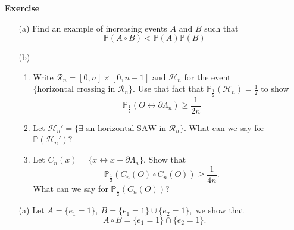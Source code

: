 \documentclass[12pt,a4paper]{report}
\theoremstyle{definition}
\newcommand{\SOL}{\fbox{ \tt s\parbox[b][2pt][c]{6pt}{o}\hspace*{-7pt} L:}}
\begin{document}
\begin{enumerate}
\begin{proof}
\begin{enumerate}
    \end{enumerate}
    Next, we show that $s_k$ is 1-1 and make conclude. By the behavior of $s_k$, it suffices to show that $s_k(\hat{\omega})\notin\hat{A}^{k+1}\circ \hat{B} $ if $\hat{\omega}\notin \hat{A}^k\circ \hat{B}.$ Suppose that $\hat{\omega}^k\in A,$ because of $\hat{\omega}^{k+1}\in A$ and 
    \newpage
    $A$ is a increasing event, we find that $I\backslash\{e_k\}$ is a witness of $\hat{\omega}\in \hat{A}^{k+1}$(also $\hat{\omega}\in \hat{A}^k$), $J$ is a witness of $\hat{
    \omega}\in \hat{B},\Rightarrow \hat{\omega}\in \hat{A}^k\circ \hat{B} $ (contradiction) Thus $s_k(\hat{\omega})^{k+1}=\hat{\omega}^k\notin A,$ thus $s_k(\hat{\omega})\notin \hat{A}^{k+1}\Rightarrow s_k(\hat{\omega})\notin\hat{A}^{k+1}\circ \hat{B}.$\\
    \end{proof}
    \item[\textbf{Exercise}] \begin{enumerate}
        \item[(a)] Find an example of increasing events $A$ and $B$ such that 
        \[
        \mathbb{P}(A\circ B)<\mathbb{P}(A)\mathbb{P}(B)
        \]
        \item[(b)] \begin{enumerate}
            \item Write $\mathcal{R}_n=[0,n]\times [0,n-1]$ and $\mathcal{H}_n$ for the event $\{\mbox{horizontal crossing in }\mathcal{R}_n\}.$ Use that fact that $\mathbb{P}_{\frac{1}{2}}(\mathcal{H}_n)=\frac{1}{2}$ to show
            \[
            \mathbb{P}_{\frac{1}{2}}(O\leftrightarrow\partial\Lambda_n)\geq \frac{1}{2n}
            \]
            \item Let $\mathcal{H}_n'=\{\exists\mbox{ an horizontal SAW in }\mathcal{R}_n\}.$ What can we say for $\mathbb{P}(\mathcal{H}_n')?$
            \item Let $C_n(x)=\{x\leftrightarrow x+\partial\Lambda_n\}.$ Show that 
            \[
            \mathbb{P}_{\frac{1}{2}}(C_n(O)\circ C_n(O))\geq \frac{1}{4n}.
            \]
            What can we say for $\mathbb{P}_{\frac{1}{2}}(C_n(O))?$
        \end{enumerate}
    \end{enumerate}
    \item[\SOL] \begin{enumerate}
        \item[(a)] Let $A=\{e_1=1\},\ B=\{e_1=1\}\cup \{e_2=1\},$ we show that 
        \[
        A\circ B=\{e_1=1\}\cap \{e_2=1\}.
\]
\end{enumerate}
\end{enumerate}
\end{document}
